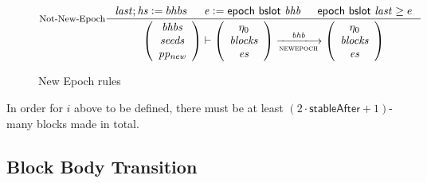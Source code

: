 \begin{figure}[ht]
  \begin{equation*}
    \inference[Not-New-Epoch]
    {
      \var{last};\var{hs} \leteq bhbs
      &
      \var{e} \leteq \epoch{\bslot{bhb}}
      &
      \epoch{\bslot{last}} \geq e
    }
    {
      \left(
        {\begin{array}{c}
           \var{bhbs} \\
           \var{seeds} \\
           \var{pp_{new}} \\
         \end{array}}
      \right)
      \vdash
      \left(
        {\begin{array}{c}
            \eta_0 \\
            \var{blocks} \\
            \var{es} \\
         \end{array}}
      \right)
    \trans{newepoch}{\var{bhb}}
      \left(
        {\begin{array}{c}
            \eta_0 \\
            \var{blocks} \\
            \var{es} \\
         \end{array}}
     \right)
    }
 \end{equation*}

\caption{New Epoch rules}
\label{fig:rules:new-epoch}
\end{figure}

\begin{note}
  In order for $i$ above to be defined, there must be at least
  $(2\cdot\mathsf{stableAfter} + 1)$-many blocks made in total.
\end{note}

\clearpage

\subsection{Block Body Transition}
\label{sec:block-trans}

